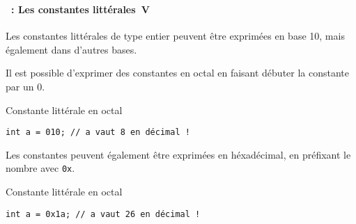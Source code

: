 \begin{frame}[containsverbatim]
  \frametitle{\secname}
  \framesubtitle{\subsecname~: Les constantes littérales~V}

  Les constantes littérales de type entier peuvent être exprimées en base 10, mais également dans d'autres bases.
  \vspace{0.3cm}
  \par
  Il est possible d'exprimer des constantes en octal en faisant débuter la constante par un 0.
  \begin{exampleblock}{Constante littérale en octal}
    \begin{verbatim}
int a = 010; // a vaut 8 en décimal !\end{verbatim}
  \end{exampleblock}
  \par
  Les constantes peuvent également être exprimées en héxadécimal, en préfixant le nombre avec \verb|0x|.
  \begin{exampleblock}{Constante littérale en octal}
    \begin{verbatim}
int a = 0x1a; // a vaut 26 en décimal !\end{verbatim}
  \end{exampleblock}
\end{frame}

